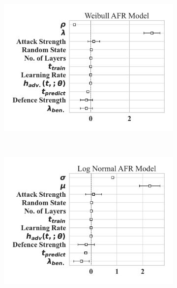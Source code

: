 \begin{figure}
    \begin{subfigure}[t]{0.3\textwidth}
        \centering
        \includegraphics[width=\textwidth]{mnist/weibull_aft.pdf}
    \end{subfigure}%
    ~ 
    \begin{subfigure}[t]{0.3\textwidth}
        \centering
        \includegraphics[width=\textwidth]{mnist/log_normal_aft.pdf}
    \end{subfigure}
    ~
    \begin{subfigure}[t]{0.3\textwidth}
        \centering

\end{subfigure}
\end{figure}
